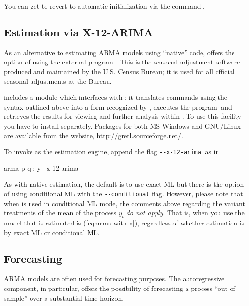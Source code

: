 You can get  to revert to automatic initialization via
the command .

\subsection{Estimation via X-12-ARIMA}

As an alternative to estimating ARMA models using ``native'' code,
 offers the option of using the external program
.  This is the seasonal adjustment software produced
and maintained by the U.S. Census Bureau; it is used for all official
seasonal adjustments at the Bureau.

 includes a module which interfaces with :
it translates  commands using the syntax outlined above into
a form recognized by , executes the program, and
retrieves the results for viewing and further analysis within
.  To use this facility you have to install
 separately.  Packages for both MS Windows and
GNU/Linux are available from the  website,
\url{http://gretl.sourceforge.net/}.

To invoke  as the estimation engine, append the flag
\verb|--x-12-arima|, as in
\begin{code}
  arma p q ; y --x-12-arima
\end{code}
As with native estimation, the default is to use exact ML but there is
the option of using conditional ML with the \verb|--conditional| flag.
However, please note that when  is used in conditional
ML mode, the comments above regarding the variant treatments of the
mean of the process $y_t$ \textit{do not apply}.  That is, when you
use  the model that is estimated is
(\ref{eq:arma-with-x}), regardless of whether estimation is by exact
ML or conditional ML.


\subsection{Forecasting}
\label{arma-fcast}

ARMA models are often used for forecasting purposes.  The
autoregressive component, in particular, offers the possibility of
forecasting a process ``out of sample'' over a substantial time
horizon.

